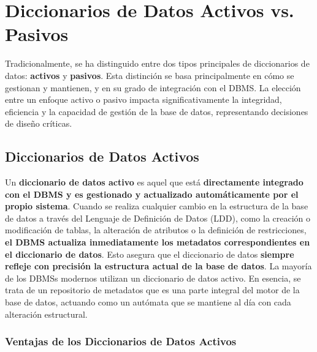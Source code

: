 \section{Diccionarios de Datos Activos vs. Pasivos}

Tradicionalmente, se ha distinguido entre dos tipos principales de diccionarios de datos: \textbf{activos} y \textbf{pasivos}. Esta distinción se basa principalmente en cómo se gestionan y mantienen, y en su grado de integración con el DBMS.  La elección entre un enfoque activo o pasivo impacta significativamente la integridad, eficiencia y la capacidad de gestión de la base de datos, representando decisiones de diseño críticas.

\subsection{Diccionarios de Datos Activos}

Un \textbf{diccionario de datos activo} es aquel que está \textbf{directamente integrado con el DBMS y es gestionado y actualizado automáticamente por el propio sistema}. Cuando se realiza cualquier cambio en la estructura de la base de datos a través del Lenguaje de Definición de Datos (LDD), como la creación o modificación de tablas, la alteración de atributos o la definición de restricciones, \textbf{el DBMS actualiza inmediatamente los metadatos correspondientes en el diccionario de datos}. Esto asegura que el diccionario de datos \textbf{siempre refleje con precisión la estructura actual de la base de datos}. La mayoría de los DBMSs modernos utilizan un diccionario de datos activo.  En esencia, se trata de un repositorio de metadatos que es una parte integral del motor de la base de datos, actuando como un autómata que se mantiene al día con cada alteración estructural.

\subsubsection{Ventajas de los Diccionarios de Datos Activos}

